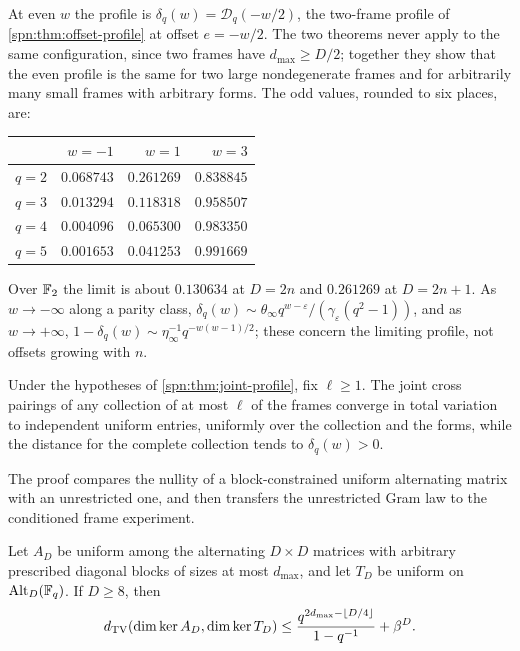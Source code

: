 At even $w$ the profile is $\delta_q(w)=\mathcal D_q(-w/2)$, the two-frame profile of
\cref{spn:thm:offset-profile} at offset $e=-w/2$. The two theorems never apply to the same
configuration, since two frames have $d_{\max}\ge D/2$; together they show that the even profile is
the same for two large nondegenerate frames and for arbitrarily many small frames with arbitrary
forms. The odd values, rounded to six places, are:
\begin{center}\small
\begin{tabular}{lrrr}
\toprule
 & $w=-1$ & $w=1$ & $w=3$\\
\midrule
$q=2$ & $0.068743$ & $0.261269$ & $0.838845$\\
$q=3$ & $0.013294$ & $0.118318$ & $0.958507$\\
$q=4$ & $0.004096$ & $0.065300$ & $0.983350$\\
$q=5$ & $0.001653$ & $0.041253$ & $0.991669$\\
\bottomrule
\end{tabular}
\end{center}
Over $\mathbb{F}_2$ the limit is about $0.130634$ at $D=2n$ and $0.261269$ at $D=2n+1$. As $w\to-\infty$
along a parity class, $\delta_q(w)\sim\theta_\infty q^{w-\varepsilon}/(\gamma_\varepsilon(q^2-1))$, and as
$w\to+\infty$, $1-\delta_q(w)\sim\eta_\infty^{-1}q^{-w(w-1)/2}$; these concern the limiting profile,
not offsets growing with $n$.

\begin{corollary}\label{spn:cor:joint-local}
Under the hypotheses of \cref{spn:thm:joint-profile}, fix $\ell\ge1$. The joint cross pairings of
any collection of at most $\ell$ of the frames converge in total variation to independent uniform
entries, uniformly over the collection and the forms, while the distance for the complete
collection tends to $\delta_q(w)>0$.
\end{corollary}

The proof compares the nullity of a block-constrained uniform alternating matrix with an
unrestricted one, and then transfers the unrestricted Gram law to the conditioned frame experiment.

\begin{lemma}\label{spn:lem:block-nullity}
Let $A_D$ be uniform among the alternating $D\times D$ matrices with arbitrary prescribed diagonal
blocks of sizes at most $d_{\max}$, and let $T_D$ be uniform on $\operatorname{Alt}_D(\mathbb{F}_q)$. If $D\ge8$, then
\[
 d_{\mathrm{TV}}(\dim\ker A_D,\dim\ker T_D)\le\frac{q^{2d_{\max}-\lfloor D/4\rfloor}}{1-q^{-1}}+\beta^D .
\]
\end{lemma}

